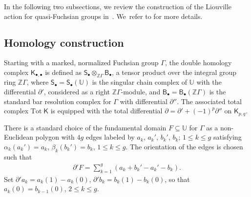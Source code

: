 \documentclass[10pt,a4paper]{amsart}
\numberwithin{equation}{section}
\newcommand{\pa}{\partial}
\begin{document}
In the following two subsections, we review the construction of the Liouville action for quasi-Fuchsian groups in~\cite{2}. We~refer to \cite[Section~2]{2} for more details.

\subsection{Homology construction}

Starting with a marked, normalized Fuchsian group $\Gamma$, the double homology complex $\mathsf{K}_{\bullet, \bullet}$ is defined as $\mathsf{S}_{\bullet}\otimes_{\mathbb{Z}\Gamma}\mathsf{B}_{\bullet}$, a tensor product over the integral group ring $\mathbb{Z}\Gamma$, where $\mathsf{S}_{\bullet}=\mathsf{S}_{\bullet}(\mathbb{U})$ is the singular chain complex of $\mathbb{U}$ with the differential $\partial'$, considered as a right $\mathbb{Z}\Gamma$-module, and $\mathsf{B}_{\bullet}=\mathsf{B}_{\bullet}(\mathbb{Z}\Gamma)$ is the standard bar resolution complex for $\Gamma$ with differential $\partial''$. The associated total complex $\text{Tot} \;\mathsf{K}$ is equipped with the total differential $\partial=\partial'+(-1)^p \partial''$ on $\mathsf{K}_{p,q}$.

There is a standard choice of the fundamental domain
$F\subseteq \mathbb{U}$ for $\Gamma$ as a non-Euclidean polygon with
$4g$ edges labeled by $a_k$, $a_k'$, $b_k'$, $b_k$; $1\leq k\leq g$ satisfying
$\alpha_k(a_k')=a_k$, $\beta_k(b_k')=b_k$, $1\leq k\leq g$. The orientation of the edges
is chosen such that
\begin{gather}\label{eq1}
\pa' F=\sum_{k=1}^{g}(a_k+b_k'-a_k'-b_k).
\end{gather}
Set $\pa' a_k=a_k(1)-a_k(0)$, $\pa' b_k=b_k(1)-b_k(0)$, so that $a_k(0)=b_{k-1}(0)$, $2\leq k \leq g$.
\end{document}
